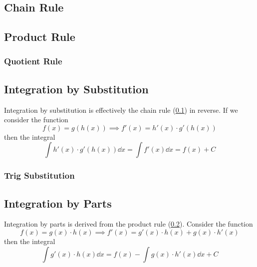 \documentclass[fleqn,a4paper,11pt]{article}
\begin{document}
    \subsection{Chain Rule} \label{sec_calc_chain}

    \subsection{Product Rule} \label{sec_calc_product}

    \subsubsection{Quotient Rule} \label{sec_calc_quotient}

    \subsection{Integration by Substitution} \label{sec_calc_substitution}

    Integration by substitution is effectively the chain rule
    (\ref{sec_calc_chain}) in reverse. If we consider the function
    \begin{equation*}
    f(x) = g(h(x)) \implies f'(x) = h'(x) \cdot g'(h(x))
    \end{equation*}
    then the integral
    \begin{equation}
    \int h'(x) \cdot g'(h(x)) \dd{x} = \int f'(x) \dd{x} = f(x) + C
    \end{equation}

    \subsubsection{Trig Substitution} \label{sec_calc_trig_substitution}

    \subsection{Integration by Parts}

    Integration by parts is derived from the product rule
    (\ref{sec_calc_product}).  Consider the function
    \begin{equation*}
    f(x) = g(x) \cdot h(x) \implies f'(x) = g'(x) \cdot h(x) + g(x) \cdot h'(x)
    \end{equation*}
    then the integral
    \begin{equation}
    \int g'(x) \cdot h(x) \dd{x} = f(x) - \int g(x) \cdot h'(x) \dd{x} + C
    \end{equation}
\end{document}
